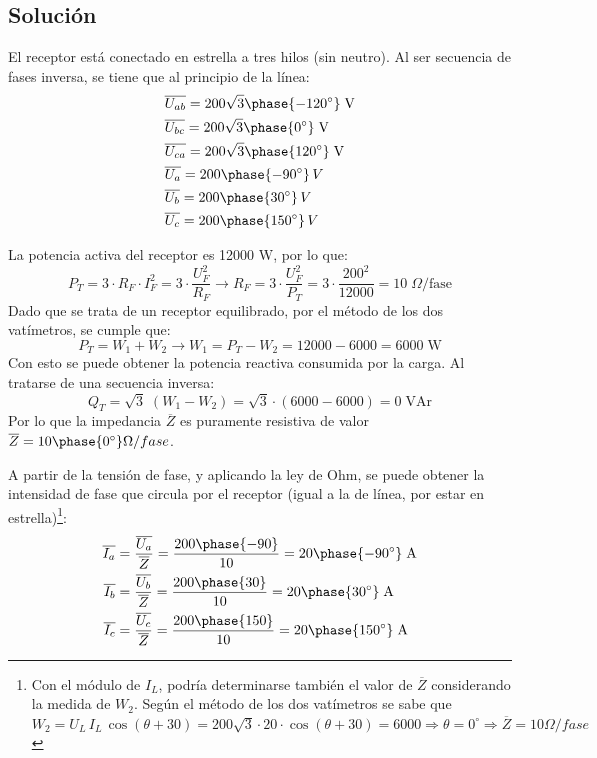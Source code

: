 \subsection*{Solución}

El receptor está conectado en estrella a tres hilos (sin neutro). Al ser secuencia de fases inversa, se tiene que al principio de la línea:
\begin{align*}
    &\overline{U_{ab}}=200\sqrt{3}\phase{-120^\circ}\;\text{V} \\
    &\overline{U_{bc}}=200\sqrt{3}\phase{0^\circ}\;\text{V} \\
    &\overline{U_{ca}}=200\sqrt{3}\phase{120^\circ}\;\text{V}  \\
    &\overline{U_a}=200\phase{-90^\circ}\,V\\
    &\overline{U_b}=200\phase{30^\circ}\,V\\
    &\overline{U_c}=200\phase{150^\circ}\,V
\end{align*}

La potencia activa del receptor es 12000 W, por lo que:
\begin{equation*}
    P_T=3\cdot R_F\cdot I_F^2=3\cdot \dfrac{U_F^2}{R_F}\rightarrow R_F=3\cdot\dfrac{U_F^2}{P_T}=3\cdot \dfrac{200^2}{12000}=10\;\Omega\text{/fase}
\end{equation*}
Dado que se trata de un receptor equilibrado, por el método de los dos vatímetros, se cumple que:
\begin{equation*}
    P_T=W_1+W_2\rightarrow W_1=P_T-W_2=12000-6000=6000\;\text{W}
\end{equation*}
Con esto se puede obtener la potencia reactiva consumida por la carga. Al tratarse de una secuencia inversa:
\begin{equation*}
    Q_T=\sqrt{3}\; (W_1-W_2)=\sqrt{3}\cdot (6000-6000)=0\;\text{VAr}
\end{equation*}
Por lo que la impedancia $\overline{Z}$ es puramente resistiva de valor $\overline{Z}=10\phase{0^\circ}\Omega/fase$.

A partir de la tensión de fase, y aplicando la ley de Ohm, se puede obtener la intensidad de fase que circula por el receptor (igual a la de línea, por estar en estrella)\footnote{Con el módulo de $I_L$, podría determinarse también el valor de $\overline{Z}$ considerando la medida de $W_2$. Según el método de los dos vatímetros se sabe que $W_2=U_L\,I_L\,\cos(\theta+30)=200\sqrt{3}\cdot 20\cdot \cos(\theta+30)=6000\Rightarrow \theta = 0^\circ\Rightarrow\overline{Z}=10\Omega/fase$}:
\begin{align*}
    \overline{I_a}&=\dfrac{\overline{U_{a}}}{\overline{Z}}=\dfrac{200\phase{-90}}{10}={20\phase{-90^\circ}\;\text{A}}\\
    \overline{I_b}&=\dfrac{\overline{U_{b}}}{\overline{Z}}=\dfrac{200\phase{30}}{10}={20\phase{30^\circ}\;\text{A}}\\
    \overline{I_c}&=\dfrac{\overline{U_{c}}}{\overline{Z}}=\dfrac{200\phase{150}}{10}={20\phase{150^\circ}\;\text{A}}
\end{align*}




